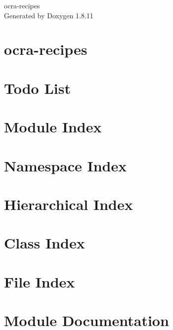 \documentclass[twoside]{book}
\newcommand{\+}{\discretionary{\mbox{\scriptsize$\hookleftarrow$}}{}{}}
\newcommand{\clearemptydoublepage}{%
  \newpage{\pagestyle{empty}\cleardoublepage}%
}
\begin{document}
\hypersetup{pageanchor=false,
             bookmarksnumbered=true,
             pdfencoding=unicode
            }
\begin{titlepage}
\vspace*{7cm}
\begin{center}%
{\Large ocra-\/recipes }\\
\vspace*{1cm}
{\large Generated by Doxygen 1.8.11}\\
\end{center}
\end{titlepage}
\clearemptydoublepage
\tableofcontents
\clearemptydoublepage
{}
\hypersetup{pageanchor=true}

\chapter{ocra-\/recipes}
\label{index}\hypertarget{index}{}
\chapter{Todo List}
\label{todo}
\hypertarget{todo}{}

\chapter{Module Index}

\chapter{Namespace Index}

\chapter{Hierarchical Index}

\chapter{Class Index}

\chapter{File Index}

\chapter{Module Documentation}





\end{document}

